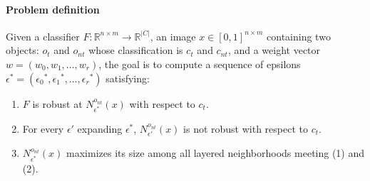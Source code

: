 \paragraph{Problem definition} Given a classifier $F: \mathbb{R}^{n \times m} \rightarrow {\mathbb{R}}^{|C|}$, an image $x \in [0,1]^{n \times m}$ containing two objects: $o_t$ and $o_{nt}$ whose classification is $c_t$ and $c_{nt}$, and a weight vector $w = (w_0, w_1, \ldots, w_r)$,
the goal is to compute a sequence of epsilons $\epsilon^* = ({\epsilon_0}^*, {\epsilon_1}^*, \ldots, {\epsilon_r}^*)$ satisfying:

\begin{enumerate}
    \item $F$ is robust at ${N^{o_{nt}}_{\epsilon^*}}(x)$ with respect to $c_t$.
    \item For every $\epsilon'$ expanding $\epsilon^*$, ${N^{o_{nt}}_{\epsilon'}}(x)$ is not robust with respect to $c_t$.
    \item ${N^{o_{nt}}_{\epsilon^*}}(x)$ maximizes its size among all layered neighborhoods meeting (1) and (2).
\end{enumerate}

